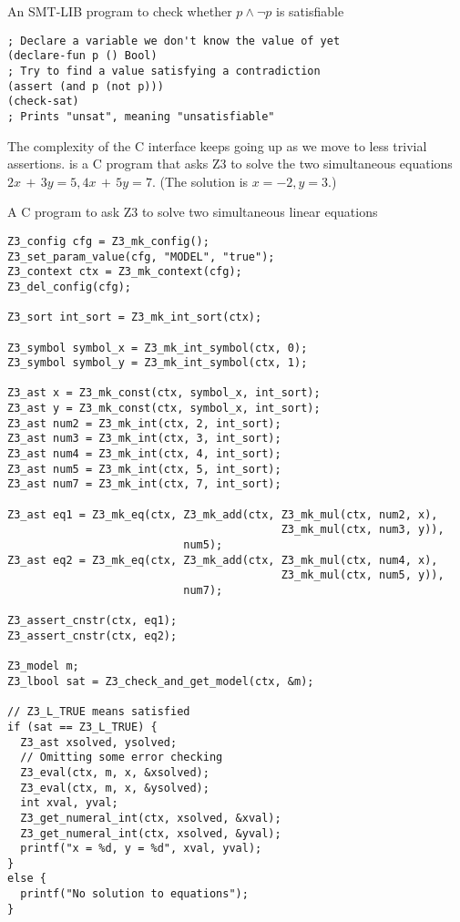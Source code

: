 \begin{program}
\caption{An SMT-LIB program to check whether $p \wedge \neg p$ is satisfiable}
\label{fig:smtlib-prop}
\begin{verbatim}
; Declare a variable we don't know the value of yet
(declare-fun p () Bool)
; Try to find a value satisfying a contradiction
(assert (and p (not p)))
(check-sat)
; Prints "unsat", meaning "unsatisfiable"
\end{verbatim}
\end{program}

The complexity of the C interface keeps going up as we move to less trivial
assertions.  is a C program that asks Z3 to solve the
two simultaneous equations $2x\,+\,3y = 5, 4x\,+\,5y = 7$. (The solution is $x =
-2, y = 3$.)

\begin{program}
\caption{A C program to ask Z3 to solve two simultaneous linear equations}
\label{fig:c-simultaneous}
\begin{verbatim}
Z3_config cfg = Z3_mk_config();
Z3_set_param_value(cfg, "MODEL", "true");
Z3_context ctx = Z3_mk_context(cfg);
Z3_del_config(cfg);

Z3_sort int_sort = Z3_mk_int_sort(ctx);

Z3_symbol symbol_x = Z3_mk_int_symbol(ctx, 0);
Z3_symbol symbol_y = Z3_mk_int_symbol(ctx, 1);

Z3_ast x = Z3_mk_const(ctx, symbol_x, int_sort);
Z3_ast y = Z3_mk_const(ctx, symbol_x, int_sort);
Z3_ast num2 = Z3_mk_int(ctx, 2, int_sort);
Z3_ast num3 = Z3_mk_int(ctx, 3, int_sort);
Z3_ast num4 = Z3_mk_int(ctx, 4, int_sort);
Z3_ast num5 = Z3_mk_int(ctx, 5, int_sort);
Z3_ast num7 = Z3_mk_int(ctx, 7, int_sort);

Z3_ast eq1 = Z3_mk_eq(ctx, Z3_mk_add(ctx, Z3_mk_mul(ctx, num2, x),
                                          Z3_mk_mul(ctx, num3, y)),
                           num5);
Z3_ast eq2 = Z3_mk_eq(ctx, Z3_mk_add(ctx, Z3_mk_mul(ctx, num4, x),
                                          Z3_mk_mul(ctx, num5, y)),
                           num7);

Z3_assert_cnstr(ctx, eq1);
Z3_assert_cnstr(ctx, eq2);

Z3_model m;
Z3_lbool sat = Z3_check_and_get_model(ctx, &m);

// Z3_L_TRUE means satisfied
if (sat == Z3_L_TRUE) {
  Z3_ast xsolved, ysolved;
  // Omitting some error checking
  Z3_eval(ctx, m, x, &xsolved);
  Z3_eval(ctx, m, x, &ysolved);
  int xval, yval;
  Z3_get_numeral_int(ctx, xsolved, &xval);
  Z3_get_numeral_int(ctx, xsolved, &yval);
  printf("x = %d, y = %d", xval, yval);
}
else {
  printf("No solution to equations");
}
\end{verbatim}
\end{program}

